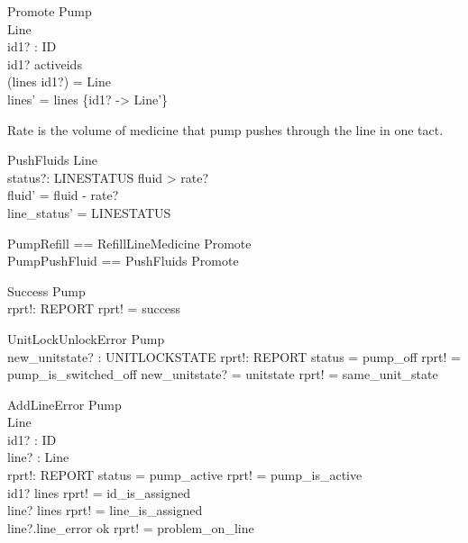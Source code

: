 \documentclass{article}
\begin{document}
	\begin{schema}{Promote}
		\Delta Pump	\\
		\Delta Line \\
		id1? : ID \\
	\where 
		id1? \in activeids \\
		(lines id1?) = \theta Line \\
		lines' = lines \oplus \{id1? -> \theta Line'\} \\		
	\end{schema}
	
	Rate is the volume of medicine that pump pushes through the line in one tact.
	\begin{schema}{PushFluids}
		\Delta Line \\
		status?: LINESTATUS
	\where 
		fluid > rate? \\
		fluid' = fluid - rate? \\
		line_status' = LINESTATUS
	\end{schema}

\begin{zed}
	PumpRefill == RefillLineMedicine \land Promote\\
	PumpPushFluid == PushFluids \land Promote\\
\end{zed}



\begin{schema}{Success}
	\Xi Pump \\
	rprt!: REPORT
	\where
	rprt! = success \\
\end{schema}

\begin{schema}{UnitLockUnlockError}
	\Xi Pump\\
	new\_unitstate? : UNITLOCKSTATE
	rprt!: REPORT
	\where
	status = pump\_off \implies rprt! = pump\_is\_switched\_off
	new\_unitstate? = unitstate \implies rprt! = same\_unit\_state
\end{schema}

\begin{schema}{AddLineError}
	\Xi Pump \\
	\Xi Line \\
	id1? : ID \\
	line? : Line \\
	rprt!: REPORT
	\where
	status = pump\_active \implies rprt! = pump\_is\_active \\
	id1? \in \dom lines \implies rprt! = id\_is\_assigned \\
	line? \in \ran lines \implies rprt! = line\_is\_assigned \\
	line?.line\_error \neq ok \implies rprt! = problem\_on\_line \\
\end{schema}
\end{document}
